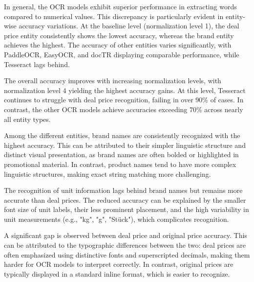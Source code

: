 \documentclass[11pt]{article}
\begin{document}
In general, the OCR models exhibit superior performance in extracting words compared to numerical values. This discrepancy is particularly evident in entity-wise accuracy variations. At the baseline level (normalization level 1), the deal price entity consistently shows the lowest accuracy, whereas the brand entity achieves the highest. The accuracy of other entities varies significantly, with PaddleOCR, EasyOCR, and docTR displaying comparable performance, while Tesseract lags behind.

The overall accuracy improves with increasing normalization levels, with normalization level 4 yielding the highest accuracy gains. At this level, Tesseract continues to struggle with deal price recognition, failing in over 90\% of cases. In contrast, the other OCR models achieve accuracies exceeding 70\% across nearly all entity types.

Among the different entities, brand names are consistently recognized with the highest accuracy. This can be attributed to their simpler linguistic structure and distinct visual presentation, as brand names are often bolded or highlighted in promotional material. In contrast, product names tend to have more complex linguistic structures, making exact string matching more challenging.

The recognition of unit information lags behind brand names but remains more accurate than deal prices. The reduced accuracy can be explained by the smaller font size of unit labels, their less prominent placement, and the high variability in unit measurements (e.g., "kg", "g", "Stück"), which complicates recognition.

A significant gap is observed between deal price and original price accuracy. This can be attributed to the typographic differences between the two: deal prices are often emphasized using distinctive fonts and superscripted decimals, making them harder for OCR models to interpret correctly. In contrast, original prices are typically displayed in a standard inline format, which is easier to recognize.
\end{document}
